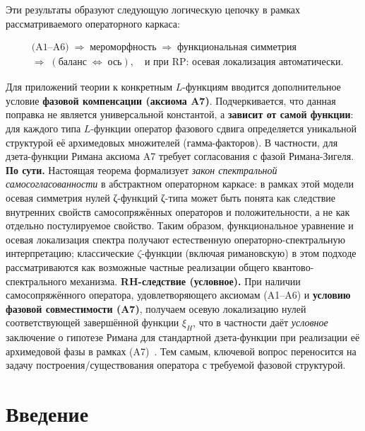 \documentclass{article}
\numberwithin{equation}{section}
\theoremstyle{plain}
\theoremstyle{definition}
\theoremstyle{remark}
\begin{document}
\noindent
Эти результаты образуют следующую логическую цепочку в рамках рассматриваемого операторного каркаса:

\begin{equation}
	\begin{aligned}
		&\text{(A1–A6)} 
		\;\Longrightarrow\;
		\text{мероморфность}
		\;\Longrightarrow\;
		\text{функциональная симметрия}
		\\
		&\Longrightarrow\;
		(\text{баланс}\;\Longleftrightarrow\;\text{ось}),
		\quad\text{и при RP: осевая локализация автоматически.}
	\end{aligned}
	\label{eq:QSSC0003}
\end{equation}

\medskip
\noindent
Для приложений теории к конкретным $L$-функциям вводится дополнительное условие \textbf{фазовой компенсации (аксиома A7)}. Подчеркивается, что данная поправка не является универсальной константой, а \textbf{зависит от самой функции}: для каждого типа $L$-функции оператор фазового сдвига определяется уникальной структурой её архимедовых множителей (гамма-факторов). В частности, для дзета-функции Римана аксиома A7 требует согласования с фазой Римана-Зигеля.
\medskip
\noindent
\textbf{По сути.}  
Настоящая теорема формализует \emph{закон спектральной самосогласованности} в абстрактном операторном каркасе: 
в рамках этой модели осевая симметрия нулей ζ-функций ζ-типа может быть понята как следствие внутренних свойств самосопряжённых операторов и положительности, а не как отдельно постулируемое свойство.  
Таким образом, функциональное уравнение и осевая локализация спектра получают естественную операторно-спектральную интерпретацию; классические $\zeta$-функции (включая римановскую) в этом подходе рассматриваются как возможные частные реализации общего квантово-спектрального механизма.
\textbf{RH-следствие (условное).} 
При наличии самосопряжённого оператора, удовлетворяющего аксиомам (A1–A6) и \textbf{условию фазовой совместимости (A7)}, получаем осевую локализацию нулей соответствующей завершённой функции $\xi_H$, что в частности даёт \emph{условное} заключение о гипотезе Римана для стандартной дзета-функции при реализации её архимедовой фазы в рамках (A7)~\cite{Connes1999,PolyaHilbert,HaaKus2024}. Тем самым, ключевой вопрос переносится на задачу построения/существования оператора с требуемой фазовой структурой.

\clearpage

\section{Введение}
\label{sec:intro}
\end{document}
